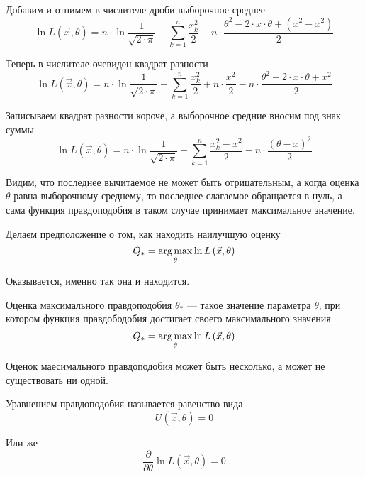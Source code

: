 \begin{example}
    Добавим и отнимем в числителе дроби выборочное среднее
    $$\ln{L\left( \vec{x},\theta \right)}
        =n\cdot\ln{\frac{1}{\sqrt{2\cdot\pi}}}
            -\sum_{k=1}^n \frac{x_k^2}{2}
            -n\cdot\frac{\theta^2
                -2\cdot\overline{x}\cdot\theta
                +\left(\overline{x}^2-\overline{x}^2\right)}{2}$$

    Теперь в числителе очевиден квадрат разности
    $$\ln{L\left( \vec{x},\theta \right)}
        =n\cdot\ln{\frac{1}{\sqrt{2\cdot\pi}}}
            -\sum_{k=1}^n \frac{x_k^2}{2}
            +n\cdot\frac{\overline{x}^2}{2}
            -n\cdot\frac{\theta^2
                -2\cdot\overline{x}\cdot\theta
                +\overline{x}^2}{2}$$

    Записываем квадрат разности короче,
    а выборочное средние вносим под знак суммы
    $$\ln{L\left( \vec{x},\theta \right)}
        =n\cdot\ln{\frac{1}{\sqrt{2\cdot\pi}}}
            -\sum_{k=1}^n \frac{x_k^2-\overline{x}^2}{2}
            -n\cdot\frac{\left(\theta-\overline{x}\right)^2}{2}$$

    Видим, что последнее вычитаемое не может быть отрицательным,
    а когда оценка $\theta$ равна выборочному среднему,
    то последнее слагаемое обращается в нуль, а сама функция правдоподобия
    в таком случае принимает максимальное значение.

    Делаем предположение о том, как находить наилучшую оценку
    $$Q_*=\underset{\theta}{\operatorname{arg\,max}}\ln{L\left( \vec{x},\theta \right)}$$

    Оказывается, именно так она и находится.
\end{example}

\begin{definition}
    Оценка максимального правдоподобия
    $\theta_*$ --- такое значение параметра $\theta$,
    при котором функция правдободобия достигает своего максимального значения
    $$Q_*=\underset{\theta}{\operatorname{arg\,max}}\ln{L\left( \vec{x},\theta \right)}$$
\end{definition}

\begin{remark}
    Оценок маесимального правдоподобия может быть несколько,
    а может не существовать ни одной.
\end{remark}

\begin{definition}
    Уравнением правдоподобия называется равенство вида
    $$U\left( \vec{x},\theta \right)=0$$

    Или же
    $$\frac{\partial}{\partial\theta}\ln{L\left( \vec{x},\theta \right)}=0$$
\end{definition}

